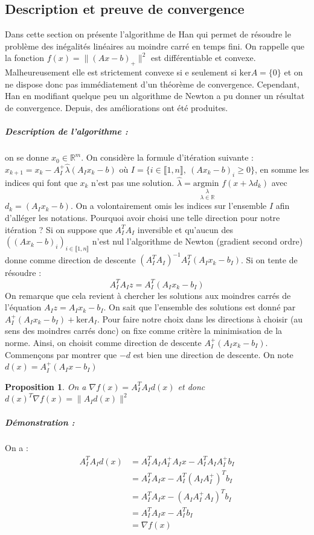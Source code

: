 \documentclass[10pt,a4paper]{article}
\newtheorem{prop}{Proposition}
\begin{document}
\subsection{Description et preuve de convergence}
Dans cette section on présente l'algorithme de Han \cite{hanalgo} qui permet de résoudre le problème des inégalités linéaires au moindre carré en temps fini.
On rappelle que la fonction $f(x)=\|(Ax-b)_+ \|^2$ est différentiable et convexe.
Malheureusement elle est strictement convexe si e seulement si $\text{ker}A=\lbrace 0\rbrace$ et on ne dispose donc pas immédiatement d'un théorème de convergence.
Cependant, Han en modifiant quelque peu un algorithme de Newton a pu donner un résultat de convergence.
Depuis, des améliorations ont été produites.
\subparagraph{Description de l'algorithme :} on se donne $x_0 \in \mathbb{R}^m$.
On considère la formule d'itération suivante : $x_{k+1}=x_k-A_I^+\widehat{\lambda}(A_Ix_k-b)$ où $I=\lbrace i \in \llbracket 1,n \rrbracket, \ (Ax_k-b)_i \ge 0 \rbrace$, en somme les indices qui font que $x_k$ n'est pas une solution. $\widehat{\lambda}=\underset{\lambda \in \mathbb{R}}{\underset{\lambda}{\text{argmin }}}f(x+\lambda d_k)$ avec $d_k=(A_Ix_k-b)$.
On a volontairement omis les indices sur l'ensemble $I$ afin d'alléger les notations.
Pourquoi avoir choisi une telle direction pour notre itération ? Si on suppose que $A_I^TA_I$ inversible et qu'aucun des $((Ax_k-b)_i)_{i \in \llbracket 1,n \rrbracket}$ n'est nul l'algorithme de Newton (gradient second ordre) donne comme direction de descente $(A_I^TA_I)^{-1}A_I^T(A_I x_k -b_I)$.
Si on tente de résoudre :
\begin{equation}
A_I^TA_Iz=A_I^T(A_Ix_k-b_I)
\end{equation}
On remarque que cela revient à chercher les solutions aux moindres carrés de l'équation $A_Iz=A_Ix_k-b_I$.
On sait que l'ensemble des solutions est donné par $A_I^+(A_I x_k -b_I)+ \text{ker}A_I$.
Pour faire notre choix dans les directions à choisir (au sens des moindres carrés donc) on fixe comme critère la minimisation de la norme.
Ainsi, on choisit comme direction de descente $A_I^+(A_I x_k -b_I)$.
Commençons par montrer que $-d$ est bien une direction de descente.
On note $d(x)=A_I^+(A_I x -b_I)$
\begin{prop}
On a $\nabla f(x) = A_I^T A_I d(x)$ et donc $d(x)^T \nabla f(x)=\| A_I d(x) \|^2$
\end{prop}
\subparagraph{Démonstration :}
On a :
\begin{equation}
\begin{aligned}
A_I^TA_Id(x)&=A_I^TA_IA_I^+A_Ix -A_I^TA_IA_I^+b_I \\
&=A_I^TA_Ix-A_I^T(A_I A_I^+)^T b_I \\
&=A_I^TA_Ix-(A_I A_I^+ A_I)^T b_I \\
&=A_I^T A_I x -A_I^T b_I \\
&= \nabla f(x)
\end{aligned}
\end{equation}
\end{document}
